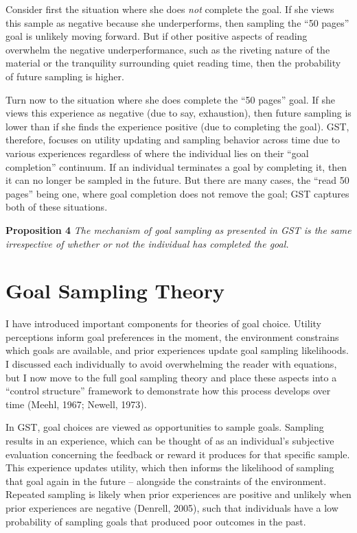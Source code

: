 \documentclass[english,man]{apa6}
\theoremstyle{definition}
\theoremstyle{definition}
\theoremstyle{definition}
\theoremstyle{remark}
\begin{document}
Consider first the situation where she does \emph{not} complete the
goal. If she views this sample as negative because she underperforms,
then sampling the \enquote{50 pages} goal is unlikely moving forward.
But if other positive aspects of reading overwhelm the negative
underperformance, such as the riveting nature of the material or the
tranquility surrounding quiet reading time, then the probability of
future sampling is higher.

Turn now to the situation where she does complete the \enquote{50 pages}
goal. If she views this experience as negative (due to say, exhaustion),
then future sampling is lower than if she finds the experience positive
(due to completing the goal). GST, therefore, focuses on utility
updating and sampling behavior across time due to various experiences
regardless of where the individual lies on their \enquote{goal
completion} continuum. If an individual terminates a goal by completing
it, then it can no longer be sampled in the future. But there are many
cases, the \enquote{read 50 pages} being one, where goal completion does
not remove the goal; GST captures both of these situations.

\textbf{Proposition 4} \emph{The mechanism of goal sampling as presented
in GST is the same irrespective of whether or not the individual has
completed the goal.}

\section{Goal Sampling Theory}\label{goal-sampling-theory}

I have introduced important components for theories of goal choice.
Utility perceptions inform goal preferences in the moment, the
environment constrains which goals are available, and prior experiences
update goal sampling likelihoods. I discussed each individually to avoid
overwhelming the reader with equations, but I now move to the full goal
sampling theory and place these aspects into a \enquote{control
structure} framework to demonstrate how this process develops over time
(Meehl, 1967; Newell, 1973).

In GST, goal choices are viewed as opportunities to sample goals.
Sampling results in an experience, which can be thought of as an
individual's subjective evaluation concerning the feedback or reward it
produces for that specific sample. This experience updates utility,
which then informs the likelihood of sampling that goal again in the
future -- alongside the constraints of the environment. Repeated
sampling is likely when prior experiences are positive and unlikely when
prior experiences are negative (Denrell, 2005), such that individuals
have a low probability of sampling goals that produced poor outcomes in
the past.
\end{document}
